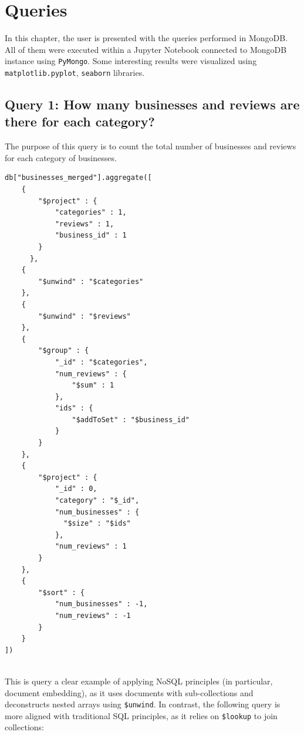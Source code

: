 \documentclass{Configuration_Files/PoliMi3i_thesis}
\begin{document}
\cleardoublepage

\chapter{Queries}
In this chapter, the user is presented with the queries performed in MongoDB. All of them were executed within a Jupyter Notebook connected to MongoDB instance using \texttt{PyMongo}. Some interesting results were visualized using \texttt{matplotlib.pyplot}, \texttt{seaborn} libraries.

\section{Query 1: How many businesses and reviews are there for each category?}

The purpose of this query is to count the total number of businesses and reviews for each category of businesses.

\bigskip
    
\begin{lstlisting}[style=mongodb]
db["businesses_merged"].aggregate([
    {
        "$project" : {
            "categories" : 1,
            "reviews" : 1,
            "business_id" : 1
        }
      },
    {
        "$unwind" : "$categories"
    },
    {
        "$unwind" : "$reviews"
    },
    {
        "$group" : {
            "_id" : "$categories",
            "num_reviews" : {
                "$sum" : 1
            },
            "ids" : {
                "$addToSet" : "$business_id"
            }
        }
    },
    {
        "$project" : {
            "_id" : 0,
            "category" : "$_id",
            "num_businesses" : {
              "$size" : "$ids"
            },
            "num_reviews" : 1
        }
    },
    {
        "$sort" : {
            "num_businesses" : -1,
            "num_reviews" : -1
        }
    }
])
 
\end{lstlisting}

\bigskip

This is query a clear example of applying NoSQL principles (in particular, document embedding), as it uses documents with sub-collections and deconstructs nested arrays using \texttt{\$unwind}. In contrast, the following query is more aligned with traditional SQL principles, as it relies on \texttt{\$lookup} to join collections:
\end{document}
